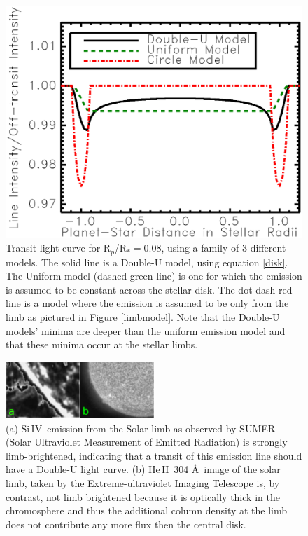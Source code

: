 \documentclass[twocolumn]{emulateapj}
\newcommand{\heII}{\ensuremath{\mathrm{He}\,\scriptstyle \mathrm{II}}}
\newcommand{\siIV}{\ensuremath{\mathrm{Si}\,\scriptstyle \mathrm{IV}}}
\newcommand{\p}{R$_p$/R$_*$}
\begin{document}
\begin{figure}
\begin{center}
\includegraphics[width=0.5 \textwidth]{model_compare2.eps}
\caption{Transit light curve for \p $=0.08$, using a family of 3 different models. The solid line is a Double-U model, using equation \ref{disk}. The Uniform model (dashed green line) is one for which the emission is assumed to be constant across the stellar disk. The dot-dash red line is a model where the emission is assumed to be only from the limb as pictured in Figure \ref{limbmodel}. Note that the Double-U models' minima are deeper than the uniform emission model and that these minima occur at the stellar limbs. }
\end{center}
\label{fig02}
\end{figure}

\begin{figure}
\begin{center}
\includegraphics[width=0.5\textwidth]{limb_compare_siIV_heII.eps}
\caption{(a) \siIV\ emission from the Solar limb as observed by SUMER (Solar Ultraviolet Measurement of Emitted Radiation) \citep{wiik} is strongly limb-brightened, indicating that a transit of this emission line should have a Double-U light curve. (b) \heII\ 304 \AA\ image of the solar limb, taken by the Extreme-ultraviolet Imaging Telescope \citep{feldman} is, by contrast, not limb brightened because it is optically thick in the chromosphere and thus the additional column density at the limb does not contribute any more flux then the central disk.}
\label{limbs}
\end{center}
\end{figure}
\end{document}
